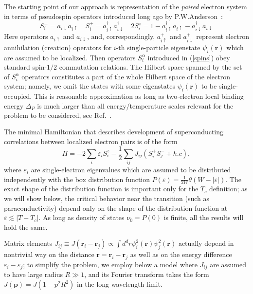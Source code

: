 \documentclass[twocolumn,english,prb]{revtex4-1}
\begin{document}
The starting point of our approach is representation of the \textit{paired} electron system in terms of
pseudospin operators introduced long ago by P.W.Anderson~\cite{AndersonPseudo}:
\begin{equation}
S_i^- = a_{i\downarrow}a_{i\uparrow} \quad S_i^+ = a_{i\uparrow}^\dagger a_{i\downarrow}^\dagger  
\quad 2S_i^z = 1 - a_{i\uparrow}^\dagger a_{i\uparrow} -  a_{i\downarrow}^\dagger a_{i\downarrow}
\label{spins}
\end{equation}
Here operators $a_{i\uparrow}$ and $a_{i\downarrow}$, and, correspondingly,
$a_{i\uparrow}^+$ and $a_{i\downarrow}^+$ represent electron annihilation (creation) operators
for $i$-th single-particle eigenstate $\psi_i(\boldsymbol{r})$ which are assumed to be localized.
  Then operators $S_i^\alpha$ introduced in (\ref{spins}) obey standard
 spin-$1/2$ commutation relations. The Hilbert space spanned by the set of $S_i^\alpha$ operators
constitutes a part of the whole Hilbert space of the electron system; namely, we omit the states with
some eigenstates $\psi_i(\boldsymbol{r})$ to be single-occupied. This is reasonable approximation as long as
two-electron local binding energy $\Delta_P$ is much larger than all energy/temperature scales relevant
for the problem to be considered, see Ref.~\cite{t2}. 

The minimal Hamiltonian that describes development of superconducting correlations between localized
electron pairs is of the form
\begin{equation}
\label{eq:PseudospinHamiltonian}
H=-2\sum_{i}\varepsilon_{i}S_{i}^{z}-\frac{1}{2}\sum_{ij}J_{ij}(S_{i}^{+}S_{j}^{-}+h.c),
\end{equation}
where $\varepsilon_i$ are single-electron eigenvalues which
 are assumed to be distributed independently with the box 
distribution function $P(\varepsilon) = \frac{1}{2W}\theta(W-|\varepsilon|)$. The exact shape of the distribution function is important only for the $T_c$ definition; as we will show below, the critical behavior near the transition (such as paraconductivity) depend only on the shape of the distribution function at $\varepsilon \lesssim |T - T_c|$. As long as density of states $\nu_0 = P(0)$ is finite, all the results will hold the same.

Matrix elements 
$J_{ij}\equiv J(\boldsymbol{r}_{i}-\boldsymbol{r}_{j}) \propto \int d^d r \psi_i^2(\boldsymbol{r}) \psi_j^2(\boldsymbol{r})$ 
actually depend in nontrivial way on the distance $\boldsymbol{r} = \boldsymbol{r}_{i}-\boldsymbol{r}_{j} $
as well as on the energy difference $\varepsilon_i-\varepsilon_j$; to simplify the problem, we  employ below a model
where $J_{ij}$
are assumed to have large radius $R\gg1$, and its Fourier transform  takes the form $J(\boldsymbol{p}) = J(1 - p^2 R^2)$
in the long-wavelength limit.
\end{document}
